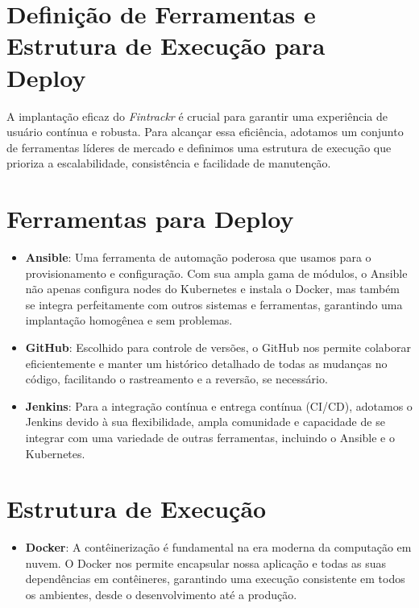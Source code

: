 \section{Definição de Ferramentas e Estrutura de Execução para Deploy}

A implantação eficaz do \textit{Fintrackr} é crucial para garantir uma experiência de usuário contínua e robusta. Para alcançar essa eficiência, adotamos um conjunto de ferramentas líderes de mercado e definimos uma estrutura de execução que prioriza a escalabilidade, consistência e facilidade de manutenção.

\section{Ferramentas para Deploy}

\begin{itemize}
	\item \textbf{Ansible}: Uma ferramenta de automação poderosa que usamos para o provisionamento e configuração. Com sua ampla gama de módulos, o Ansible não apenas configura nodes do Kubernetes e instala o Docker, mas também se integra perfeitamente com outros sistemas e ferramentas, garantindo uma implantação homogênea e sem problemas.
	      
	\item \textbf{GitHub}: Escolhido para controle de versões, o GitHub nos permite colaborar eficientemente e manter um histórico detalhado de todas as mudanças no código, facilitando o rastreamento e a reversão, se necessário.
	      
	\item \textbf{Jenkins}: Para a integração contínua e entrega contínua (CI/CD), adotamos o Jenkins devido à sua flexibilidade, ampla comunidade e capacidade de se integrar com uma variedade de outras ferramentas, incluindo o Ansible e o Kubernetes.
\end{itemize}

\section{Estrutura de Execução}

\begin{itemize}
	\item \textbf{Docker}: A contêinerização é fundamental na era moderna da computação em nuvem. O Docker nos permite encapsular nossa aplicação e todas as suas dependências em contêineres, garantindo uma execução consistente em todos os ambientes, desde o desenvolvimento até a produção.
\end{itemize}
